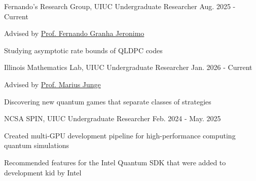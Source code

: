 

\begin{cventries}

  \cventry
    {Fernando's Research Group, UIUC} %
    {Undergraduate Researcher} %
    {} %
    {Aug. 2025 - Current} %
    {
      \begin{cvitems} %
        \item Advised by \href{https://granha.github.io}{Prof. Fernando Granha Jeronimo}
        \item Studying asymptotic rate bounds of QLDPC codes
      \end{cvitems}
    }
    
 \vspace{3mm}
 
 \cventry
    {Illinois Mathematics Lab, UIUC} %
    {Undergraduate Researcher} %
    {} %
    {Jan. 2026 - Current} %
    {
      \begin{cvitems} %
        \item Advised by \href{https://publish.illinois.edu/mjunge/}{Prof. Marius Junge}
        \item Discovering new quantum games that separate classes of strategies
      \end{cvitems}
    }

 \vspace{3mm}

 \cventry
    {NCSA SPIN, UIUC} %
    {Undergraduate Researcher} %
    {} %
    {Feb. 2024 - May. 2025} %
    {
      \begin{cvitems} %
        \item Created multi-GPU development pipeline for high-performance computing quantum simulations
        \item Recommended features for the Intel Quantum SDK that were added to development kid by Intel
      \end{cvitems}
    }


\end{cventries}

